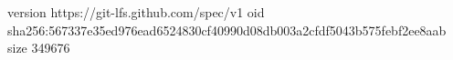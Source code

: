 version https://git-lfs.github.com/spec/v1
oid sha256:567337e35ed976ead6524830cf40990d08db003a2cfdf5043b575febf2ee8aab
size 349676
